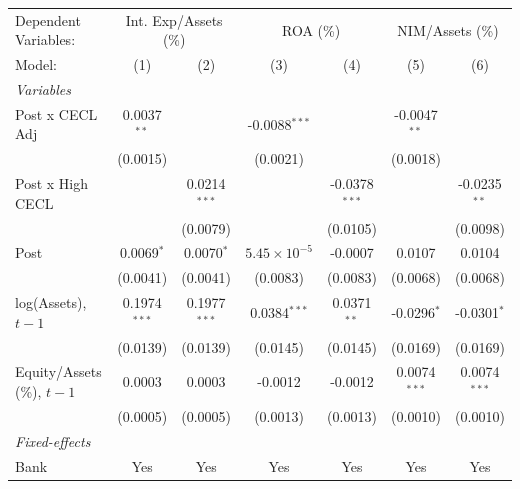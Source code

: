 
\begingroup
\centering
\begin{tabular}{lcccccc}
   \tabularnewline \midrule \midrule
   Dependent Variables: & \multicolumn{2}{c}{Int. Exp/Assets (\%)} & \multicolumn{2}{c}{ROA (\%)} & \multicolumn{2}{c}{NIM/Assets (\%)}\\
   Model:                       & (1)            & (2)            & (3)                   & (4)             & (5)            & (6)\\  
   \midrule
   \emph{Variables}\\
   Post x CECL Adj              & 0.0037$^{**}$  &                & -0.0088$^{***}$       &                 & -0.0047$^{**}$ &   \\   
                                & (0.0015)       &                & (0.0021)              &                 & (0.0018)       &   \\   
   Post x High CECL             &                & 0.0214$^{***}$ &                       & -0.0378$^{***}$ &                & -0.0235$^{**}$\\   
                                &                & (0.0079)       &                       & (0.0105)        &                & (0.0098)\\   
   Post                         & 0.0069$^{*}$   & 0.0070$^{*}$   & $5.45\times 10^{-5}$  & -0.0007         & 0.0107         & 0.0104\\   
                                & (0.0041)       & (0.0041)       & (0.0083)              & (0.0083)        & (0.0068)       & (0.0068)\\   
   log(Assets), $t{-}1$         & 0.1974$^{***}$ & 0.1977$^{***}$ & 0.0384$^{***}$        & 0.0371$^{**}$   & -0.0296$^{*}$  & -0.0301$^{*}$\\   
                                & (0.0139)       & (0.0139)       & (0.0145)              & (0.0145)        & (0.0169)       & (0.0169)\\   
   Equity/Assets (\%), $t{-}1$  & 0.0003         & 0.0003         & -0.0012               & -0.0012         & 0.0074$^{***}$ & 0.0074$^{***}$\\   
                                & (0.0005)       & (0.0005)       & (0.0013)              & (0.0013)        & (0.0010)       & (0.0010)\\   
   \midrule
   \emph{Fixed-effects}\\
   Bank                         & Yes            & Yes            & Yes                   & Yes             & Yes            & Yes\\  

\end{tabular}
